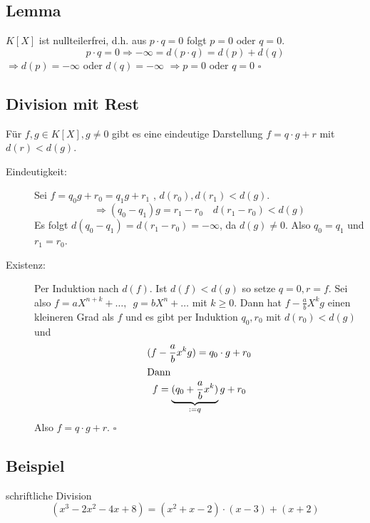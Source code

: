 \subsection[Lemma: Der Polynomring ist nullteilerfrei]{Lemma} %
\label{sub:46}
$K[X]$ ist nullteilerfrei, d.h. aus $p \cdot q =0$ folgt $p=0$ oder $q=0$.
\[
	p \cdot q = 0 \Longrightarrow - \infty = d(p \cdot q)= d(p) + d(q)
\]
$\Rightarrow d(p)= -\infty$ oder $d(q)=-\infty$ \quad $\Rightarrow p= 0$ oder $q=0$ \hfill \( \square \)

\subsection[Division mit Rest bei Polynomen]{Division mit Rest} %
\label{sub:47}
Für $f,g \in K[X], g\not=0$ gibt es eine eindeutige Darstellung $f=q \cdot g + r$ mit $d(r) < d(g)$.
\begin{description}
	\item[Eindeutigkeit:] Sei $f=q_0 g + r_0 = q_1 g + r_1 $ , $d(r_0), d(r_1) < d(g)$. 
	\[
		\Rightarrow (q_0 -q_1)g = r_1 - r_0 \quad d(r_1 -r_0) < d(g)
	\]
	Es folgt $d(q_0 - q_1) = d(r_1 -r_0)= - \infty$, da $d(g)\not= 0$. Also $q_0=q_1$ und $r_1=r_0$.
	\item[Existenz:] Per Induktion nach $d(f)$. Ist $d(f)<d(g)$ so setze $q=0, r=f$. Sei also $f=a X^{n+k}+ \ldots , \enspace g=bX^n + \ldots $ mit $k\ge 0$. Dann hat
	$f- \frac{a}{b} X^k g $ einen kleineren Grad als $f$ und es gibt per Induktion $q_0,r_0$ mit $d(r_0)<d(g)$ und
	\begin{gather*}
		(f - \frac{a}{b} x^k g) = q_0 \cdot g + r_0 \\
		\intertext{Dann}
		f = \underbrace{(q_0 + \frac{a}{b} x^k)}_{:= q} g + r_0 
	\end{gather*}
	Also $f= q \cdot g +r$. \hfill \( \square \)	
\end{description}

\subsection[Beispiel für Polynomdivision]{Beispiel} %
\label{sub:48}
schriftliche Division
\[
	(x^3 -2x^2 - 4x +8)= (x^2 +x -2) \cdot (x -3) +(x+2)
\]


